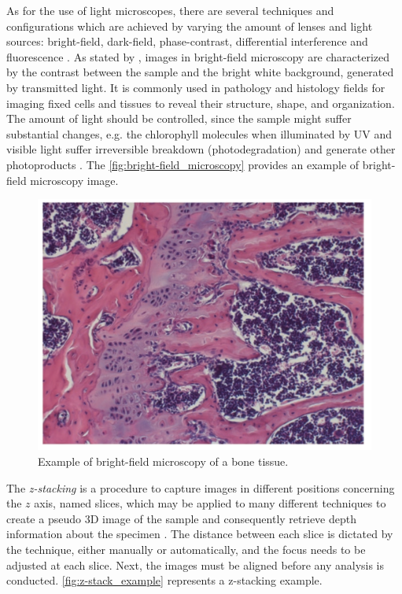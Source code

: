 As for the use of light microscopes, there are several techniques and configurations which are achieved by varying the amount of lenses and light sources: bright-field, dark-field, phase-contrast, differential interference and fluorescence \cite{roane2009microscopic}. As stated by , images in bright-field microscopy are characterized by the contrast between the sample and the bright white background, generated by transmitted light. It is commonly used in pathology and histology fields for imaging fixed cells and tissues to reveal their structure, shape, and organization. The amount of light should be controlled, since the sample might suffer substantial changes, e.g. the chlorophyll molecules when illuminated by UV and visible light suffer irreversible breakdown (photodegradation) and generate other photoproducts \cite{petrovic2017clorophyll}. The \autoref{fig:bright-field_microscopy} provides an example of bright-field microscopy image.

\begin{figure}[htb]
	\centering
	\caption{\label{fig:bright-field_microscopy} Example of bright-field microscopy of a bone tissue.}
	\begin{center}
	    \includegraphics[scale=0.3]{images/bright-field_microscopy.png}
	\end{center}
	\centering
\end{figure}

The \textit{z-stacking} is a procedure to capture images in different positions concerning the $z$ axis, named slices, which may be applied to many different techniques to create a pseudo 3D image of the sample and consequently retrieve depth information about the specimen \cite{lawlor2019introduction}. The distance between each slice is dictated by the technique, either manually or automatically, and the focus needs to be adjusted at each slice. Next, the images must be aligned before any analysis is conducted. \autoref{fig:z-stack_example} represents a z-stacking example.

